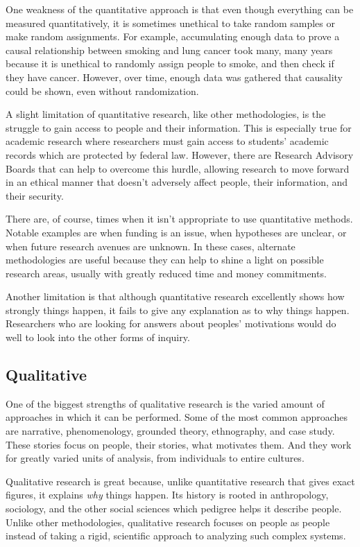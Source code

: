 \documentclass[man,natbib]{apa6}
\begin{document}
One weakness of the quantitative approach is that even though everything can be measured quantitatively, it is sometimes unethical to take random samples or make random assignments. For example, accumulating enough data to prove a causal relationship between smoking and lung cancer took many, many years because it is unethical to randomly assign people to smoke, and then check if they have cancer. However, over time, enough data was gathered that causality could be shown, even without randomization.

A slight limitation of quantitative research, like other methodologies, is the struggle to gain access to people and their information. This is especially true for academic research where researchers must gain access to students' academic records which are protected by federal law. However, there are Research Advisory Boards that can help to overcome this hurdle, allowing research to move forward in an ethical manner that doesn't adversely affect people, their information, and their security.

There are, of course, times when it isn't appropriate to use quantitative methods. Notable examples are when funding is an issue, when hypotheses are unclear, or when future research avenues are unknown. In these cases, alternate methodologies are useful because they can help to shine a light on possible research areas, usually with greatly reduced time and money commitments.

Another limitation is that although quantitative research excellently shows how strongly things happen, it fails to give any explanation as to why things happen. Researchers who are looking for answers about peoples' motivations would do well to look into the other forms of inquiry.

\subsection{Qualitative}
One of the biggest strengths of qualitative research is the varied amount of approaches in which it can be performed. Some of the most common approaches are narrative, phenomenology, grounded theory, ethnography, and case study. These stories focus on people, their stories, what motivates them. And they work for greatly varied units of analysis, from individuals to entire cultures.

Qualitative research is great because, unlike quantitative research that gives exact figures, it explains \emph{why} things happen. Its history is rooted in anthropology, sociology, and the other social sciences which pedigree helps it describe people. Unlike other methodologies, qualitative research focuses on people as people instead of taking a rigid, scientific approach to analyzing such complex systems.
\end{document}
